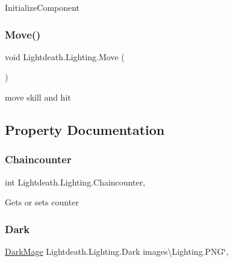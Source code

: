 Initialize\+Component 

\hypertarget{class_lightdeath_1_1_lighting_ad8f10c0b173b0cd317d3566ea901991c}{}\label{class_lightdeath_1_1_lighting_ad8f10c0b173b0cd317d3566ea901991c} 
\subsubsection{\texorpdfstring{Move()}{Move()}}
{\footnotesize\ttfamily void Lightdeath.\+Lighting.\+Move (\begin{DoxyParamCaption}{ }\end{DoxyParamCaption})\hspace{0.3cm}{\ttfamily [inline]}}



move skill and hit 



\subsection{Property Documentation}
\hypertarget{class_lightdeath_1_1_lighting_ab835e20ae287e354d7e2a2185a75a8c2}{}\label{class_lightdeath_1_1_lighting_ab835e20ae287e354d7e2a2185a75a8c2} 
\subsubsection{\texorpdfstring{Chaincounter}{Chaincounter}}
{\footnotesize\ttfamily int Lightdeath.\+Lighting.\+Chaincounter\hspace{0.3cm}{\ttfamily [get]}, {\ttfamily [set]}}



Gets or sets counter 

\hypertarget{class_lightdeath_1_1_lighting_a7411b9d9c87dfdd5471312ac876105fc}{}\label{class_lightdeath_1_1_lighting_a7411b9d9c87dfdd5471312ac876105fc} 
\subsubsection{\texorpdfstring{Dark}{Dark}}
{\footnotesize\ttfamily \hyperlink{class_lightdeath_1_1_dark_mage}{Dark\+Mage} Lightdeath.\+Lighting.\+Dark images\textbackslash{}\+Lighting.\+P\+NG\char`\"{}\hspace{0.3cm}{\ttfamily [get]}, {\ttfamily [set]}}



